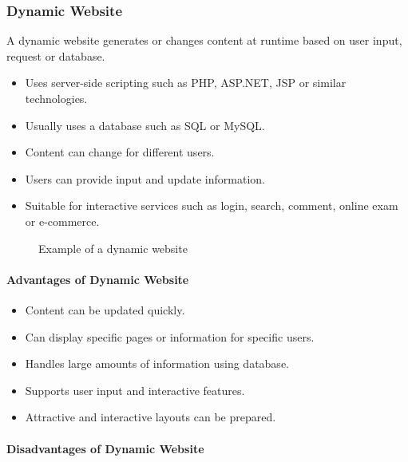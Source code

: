 \subsubsection{Dynamic Website}

\begin{definitionbox}
A dynamic website generates or changes content at runtime based on user input, request or database.
\end{definitionbox}

\begin{itemize}
    \item Uses server-side scripting such as PHP, ASP.NET, JSP or similar technologies.
    \item Usually uses a database such as SQL or MySQL.
    \item Content can change for different users.
    \item Users can provide input and update information.
    \item Suitable for interactive services such as login, search, comment, online exam or e-commerce.
\end{itemize}

\begin{figure}[H]
    \centering
    \caption{Example of a dynamic website}
    \label{fig:dynamic-website}
\end{figure}

\paragraph{Advantages of Dynamic Website}

\begin{itemize}
    \item Content can be updated quickly.
    \item Can display specific pages or information for specific users.
    \item Handles large amounts of information using database.
    \item Supports user input and interactive features.
    \item Attractive and interactive layouts can be prepared.
\end{itemize}

\paragraph{Disadvantages of Dynamic Website}

